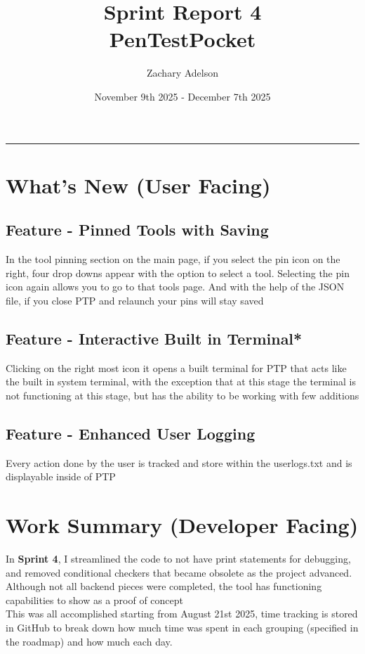 \documentclass{article}
\title{Sprint Report 4\\\small{PenTestPocket}}
\author{Zachary Adelson}
\date{November 9th 2025 - December 7th 2025}
\begin{document}
\maketitle
\rule{10cm}{0.25pt}
\centering

\section{What's New (User Facing)}
\subsection{Feature - Pinned Tools with Saving}  In the tool pinning section on the main page, if you select the pin icon on the right, four drop downs appear with the option to select a tool. Selecting the pin icon again allows you to go to that tools page. And with the help of the JSON file, if you close PTP and relaunch your pins will stay saved

\subsection{Feature - Interactive Built in Terminal*} Clicking on the right most icon it opens a built terminal for PTP that acts like the built in system terminal, with the exception that at this stage the terminal is not functioning at this stage, but has the ability to be working with few additions

\subsection{Feature - Enhanced User Logging} Every action done by the user is tracked and store within the userlogs.txt and is displayable inside of PTP

\newpage
\section{Work Summary (Developer Facing)}
\large{
In \textbf{Sprint 4}, I streamlined the code to not have print statements for debugging, and removed conditional checkers that became obsolete as the project advanced. Although not all backend pieces were completed, the tool has functioning capabilities to show as a proof of concept\\ This was all accomplished starting from August 21st 2025, time tracking is stored in GitHub to break down how much time was spent in each grouping (specified in the roadmap) and how much each day.
}
\newpage
\end{document}
